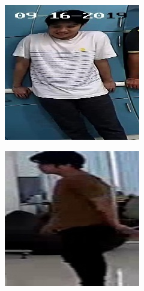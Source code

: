 \begin{figure}[!ht]
\begin{subfigure}[b]{0.45\linewidth}
    \end{subfigure}
    \begin{subfigure}[b]{0.45\linewidth}
      \includegraphics[width=\linewidth]{appendix/stand/000_CXS0_D0_001046.jpg}
    \end{subfigure}
    \begin{subfigure}[b]{0.45\linewidth}
      \includegraphics[width=\linewidth]{appendix/stand/001_CXS3_D2_000254.jpg}

\end{subfigure}
\end{figure}
